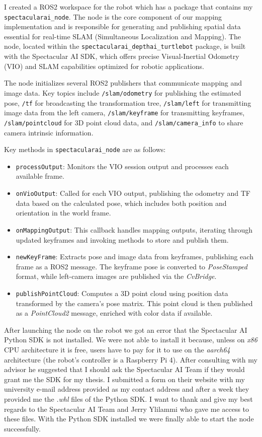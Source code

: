 I created a ROS2 workspace for the robot which has a package that contains my \verb|spectacularai_node|. The node is the core component of our mapping implementation and is responsible for generating and publishing spatial data essential for real-time SLAM (Simultaneous Localization and Mapping). The node, located within the \verb|spectacularai_depthai_turtlebot| package, is built with the Spectacular AI SDK, which offers precise Visual-Inertial Odometry (VIO) and SLAM capabilities optimized for robotic applications.

The node initializes several ROS2 publishers that communicate mapping and image data. Key topics include \verb|/slam/odometry| for publishing the estimated pose, \verb|/tf| for broadcasting the transformation tree, \verb|/slam/left| for transmitting image data from the left camera, \verb|/slam/keyframe| for transmitting keyframes, \verb|/slam/pointcloud| for 3D point cloud data, and \verb|/slam/camera_info| to share camera intrinsic information.

Key methods in \verb|spectacularai_node| are as follows:
\begin{itemize}
    \item \verb|processOutput|: Monitors the VIO session output and processes each available frame.
    \item \verb|onVioOutput|: Called for each VIO output, publishing the odometry and TF data based on the calculated pose, which includes both position and orientation in the world frame.
    \item \verb|onMappingOutput|: This callback handles mapping outputs, iterating through updated keyframes and invoking methods to store and publish them.
    \item \verb|newKeyFrame|: Extracts pose and image data from keyframes, publishing each frame as a ROS2 message. The keyframe pose is converted to \textit{PoseStamped} format, while left-camera images are published via the \textit{CvBridge}.
    \item \verb|publishPointCloud|: Computes a 3D point cloud using position data transformed by the camera’s pose matrix. This point cloud is then published as a \textit{PointCloud2} message, enriched with color data if available.
\end{itemize}

After launching the node on the robot we got an error that the Spectacular AI Python SDK is not installed. We were not able to install it because, unless on \textit{x86} CPU architecture it is free, users have to pay for it to use on the \textit{aarch64} architecture (the robot's controller is a Raspberry Pi 4). After consulting with my advisor he suggested that I should ask the Spectacular AI Team if they would grant me the SDK for my thesis. I submitted a form on their website with my university e-mail address provided as my contact address and after a week they provided me the \textit{.whl} files of the Python SDK. I want to thank and give my best regards to the Spectacular AI Team and Jerry Ylilammi who gave me access to these files. With the Python SDK installed we were finally able to start the node successfully.

